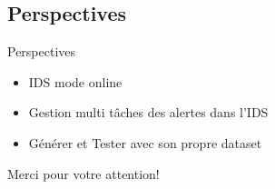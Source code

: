 \documentclass[aspectratio=169,professionalfonts, 12pt]{beamer}
\begin{document}
\subsection{Perspectives}
\begin{frame}{Perspectives}
\begin{itemize}
\item IDS mode online 
\item Gestion multi tâches des alertes dans l’IDS 
\item Générer et Tester avec son propre dataset 
\end{itemize}
\end{frame}
\begin{frame}[plain,c]
    \begin{center}
    \Huge Merci pour votre attention!
    \end{center}
\end{frame}
\end{document}
